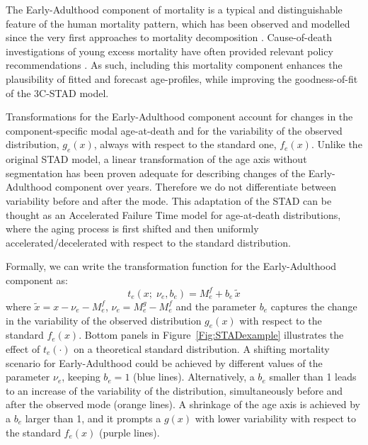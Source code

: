 \documentclass[Thesis]{subfiles}
\begin{document}
The Early-Adulthood component of mortality is a typical and distinguishable feature of the human mortality pattern, which has been observed and modelled since the very first approaches to mortality decomposition \cite[e.g.~][]{thiele1871mathematical,lexis1878duree,pearson1897chances}. Cause-of-death investigations of young excess mortality have often provided relevant policy recommendations \citep{heuveline2002international,remund2018young}. As such, including this mortality component enhances the plausibility of fitted and forecast age-profiles, while improving the goodness-of-fit of the 3C-STAD model.

Transformations for the Early-Adulthood component account for changes in the component-specific modal age-at-death and for the variability of the observed distribution, $g_{e}(x)$, always with respect to the standard one, $f_{e}(x)$. Unlike the original STAD model, a linear transformation of the age axis without segmentation has been proven adequate for describing changes of the Early-Adulthood component over years. Therefore we do not differentiate between variability before and after the mode. This adaptation of the STAD can be thought as an Accelerated Failure Time model for age-at-death distributions, where the aging process is first shifted and then uniformly accelerated/decelerated with respect to the standard distribution. 

Formally, we can write the transformation function for the Early-Adulthood component as:
%
\begin{equation}\label{Eq:STADacc}
t_{e}(x;\;\nu_{e}, b_{e}) =  M_{e}^{f} + b_{e} \, \tilde{x} 
\end{equation} 
%
where $\tilde{x} = x - \nu_{e} - M_{e}^{f}$, $\nu_{e} = M_{e}^{g} - M_{e}^{f}$ and the parameter $b_{e}$ captures the change in the variability of the observed distribution $g_{e}(x)$ with respect to the standard $f_{e}(x)$. Bottom panels in Figure~\ref{Fig:STADexample} illustrates the effect of $t_{e}(\cdot)$ on a theoretical standard distribution. A shifting mortality scenario for Early-Adulthood could be achieved by different values of the parameter $\nu_{e}$, keeping $b_{e}=1$ (blue lines). Alternatively, a $b_{e}$ smaller than 1 leads to an increase of the variability of the distribution, simultaneously before and after the observed mode (orange lines). A shrinkage of the age axis is achieved by a $b_{e}$ larger than 1, and it prompts a $g(x)$ with lower variability with respect to the standard $f_{e}(x)$ (purple lines). 
\end{document}
